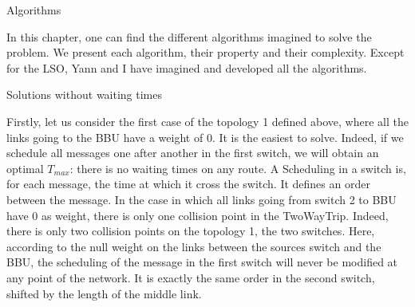 \documentclass[a4paper,10pt]{report}
\begin{document}
\begin{chapter}{Algorithms}

In this chapter, one can find the different algorithms imagined to solve the problem. We present each algorithm, their property and their complexity.
Except for the LSO, Yann and I have imagined and developed all the algorithms.

\begin{section}{Solutions without waiting times}

Firstly, let us consider the first case of the topology 1 defined above, where all the links going to the BBU
have a weight of 0. It is the easiest to solve. 
Indeed, if we schedule all messages one after another in the first switch, we will obtain an optimal
$T_{max}$: there is no waiting times on any route.
A Scheduling in a switch is, for each message, the time at which it cross the switch. It defines an order between the message.
In the case in which all links going from switch 2 to BBU have 0 as weight, there is only one collision point in the TwoWayTrip.
Indeed, there is only two collision points on the topology 1, the two switches. Here, according to the null weight on the links between the sources switch and the BBU, the scheduling of the message in the first switch will never be modified at any point of the network. It is exactly the same order in the second switch, shifted by the length of the middle link.\\


\end{section}
\end{chapter}
\end{document}
